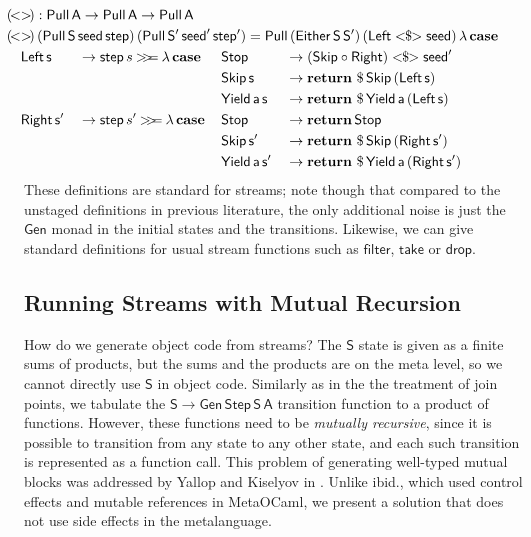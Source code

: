 \documentclass[acmsmall,screen,review,anonymous]{acmart}
\newcommand{\mit}[1]{{\mathsf{#1}}}
\newcommand{\msf}[1]{{\mathsf{#1}}}
\newcommand{\mbf}[1]{{\mathbf{#1}}}
\newcommand{\ind}{\hspace{1em}}
\newcommand{\return}{\mbf{return}\,}
\newcommand{\lam}{\lambda\,}
\newcommand{\vA}{\mathsf{A}}
\newcommand{\vS}{\mathsf{S}}
\newcommand{\va}{\mathsf{a}}
\newcommand{\vs}{\mathsf{s}}
\newcommand{\case}{\mbf{case\,}}
\newcommand{\bind}{\mathbin{>\!\!>\mkern-6.7mu=}}
\theoremstyle{remark}
\newcommand{\Gen}{\msf{Gen}}
\newcommand{\fmap}{<\!\!\$\!\!>}
\newcommand{\Either}{\msf{Either}}
\newcommand{\Left}{\msf{Left}}
\newcommand{\Right}{\msf{Right}}
\newcommand{\Stop}{\msf{Stop}}
\newcommand{\Skip}{\msf{Skip}}
\newcommand{\Yield}{\msf{Yield}}
\newcommand{\dlr}{\,\$\,}
\newcommand{\seed}{\mit{seed}}
\newcommand{\step}{\mit{step}}
\newcommand{\Step}{\msf{Step}}
\newcommand{\Pull}{\msf{Pull}}
\begin{document}
\begin{alignat*}{5}
  & \hspace{-5em}\mathrlap{(\!<>\!) : \Pull\,\vA \to \Pull\,\vA \to \Pull\,\vA} \\
  & \hspace{-5em}\mathrlap{(\!<>\!)\,(\Pull\,\vS\,\seed\,\step)\,(\Pull\,\vS'\,\seed'\,\step') = \Pull\,(\Either\,\vS\,\vS')\,(\Left \fmap \seed)\,\lam \case} \\
  & \hspace{-5em}\ind \Left\,\vs &&\to \step\,s \bind \lam \case &&\Stop             &&\to (\Skip \circ \Right) \fmap \seed'\\
  & \hspace{-5em}                    &&                          &&\Skip\,\vs        &&\to \return \dlr \Skip\,(\Left\,\vs) \\
  & \hspace{-5em}                    &&                        &&\Yield\,\va\,\vs    &&\to \return \dlr \Yield\,\va\,(\Left\,\vs)\\
  & \hspace{-5em}\ind \Right\,\vs' &&\to \step\,s' \bind \lam \case &&\Stop          &&\to \return \Stop\\
  & \hspace{-5em}                    &&                        &&\Skip\,\vs'         &&\to \return \dlr \Skip\,(\Right\,\vs') \\
  & \hspace{-5em}                    &&                        &&\Yield\,\va\,\vs'   &&\to \return \dlr \Yield\,\va\,(\Right\,\vs')
\end{alignat*}
These definitions are standard for streams; note though that compared to the
unstaged definitions in previous literature, the only additional noise is just
the $\Gen$ monad in the initial states and the transitions. Likewise, we can
give standard definitions for usual stream functions such as $\msf{filter}$,
$\msf{take}$ or $\msf{drop}$.

\subsection{Running Streams with Mutual Recursion}

How do we generate object code from streams? The $\vS$ state is given as a
finite sums of products, but the sums and the products are on the meta
level, so we cannot directly use $\vS$ in object code. Similarly as in the the
treatment of join points, we tabulate the $\vS \to \Gen\,\Step\,\vS\,\vA$
transition function to a product of functions. However, these functions need to
be \emph{mutually recursive}, since it is possible to transition from any state
to any other state, and each such transition is represented as a function call.
This problem of generating well-typed mutual blocks was addressed by Yallop and
Kiselyov in \cite{TODO}. Unlike ibid., which used control effects and mutable
references in MetaOCaml, we present a solution that does not use side effects
in the metalanguage.
\end{document}
